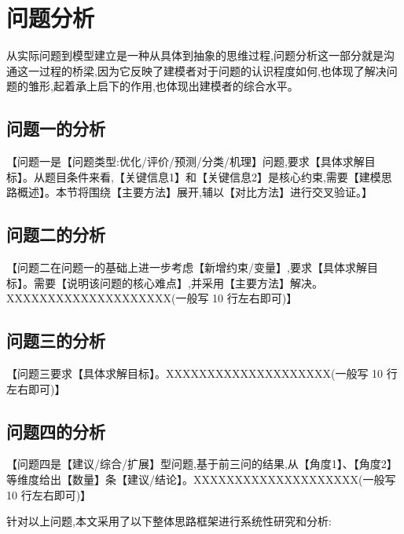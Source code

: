 
\section{问题分析}

从实际问题到模型建立是一种从具体到抽象的思维过程,问题分析这一部分就是沟通这一过程的桥梁,因为它反映了建模者对于问题的认识程度如何,也体现了解决问题的雏形,起着承上启下的作用,也体现出建模者的综合水平。


\subsection{问题一的分析}

【问题一是【问题类型:优化/评价/预测/分类/机理】问题,要求【具体求解目标】。从题目条件来看,【关键信息1】和【关键信息2】是核心约束,需要【建模思路概述】。本节将围绕【主要方法】展开,辅以【对比方法】进行交叉验证。】

\subsection{问题二的分析}

【问题二在问题一的基础上进一步考虑【新增约束/变量】,要求【具体求解目标】。需要【说明该问题的核心难点】,并采用【主要方法】解决。XXXXXXXXXXXXXXXXXXXX(一般写 10 行左右即可)】

\subsection{问题三的分析}

【问题三要求【具体求解目标】。XXXXXXXXXXXXXXXXXXXX(一般写 10 行左右即可)】

\subsection{问题四的分析}

【问题四是【建议/综合/扩展】型问题,基于前三问的结果,从【角度1】、【角度2】等维度给出【数量】条【建议/结论】。XXXXXXXXXXXXXXXXXXXX(一般写 10 行左右即可)】

针对以上问题,本文采用了以下整体思路框架进行系统性研究和分析:

